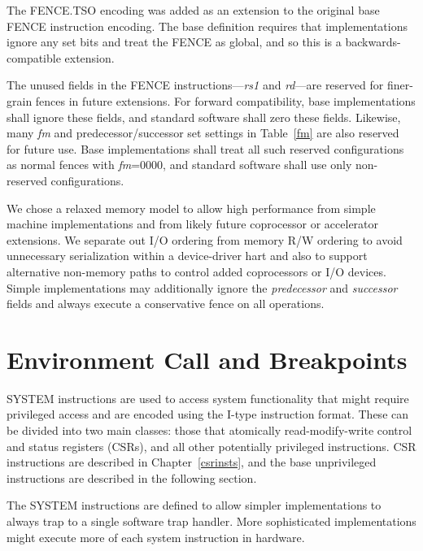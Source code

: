\begin{commentary}
  The FENCE.TSO encoding was added as an extension to the
  original base FENCE instruction encoding.  The base definition
  requires that implementations ignore any set bits and treat the
  FENCE as global, and so this is a backwards-compatible extension.
\end{commentary}

The unused fields in the FENCE instructions---{\em rs1} and {\em rd}---are
reserved for finer-grain fences in future extensions.  For forward
compatibility, base implementations shall ignore these fields, and standard
software shall zero these fields.  Likewise, many {\em fm} and
predecessor/successor set settings in Table~\ref{fm} are also reserved
for future use.  Base implementations shall treat all such reserved
configurations as normal fences with {\em fm}=0000, and standard
software shall use only non-reserved configurations.

\begin{commentary}
We chose a relaxed memory model to allow high performance from simple
machine implementations and from likely future
coprocessor or accelerator extensions.  We separate out I/O ordering
from memory R/W ordering to avoid unnecessary serialization within a
device-driver hart and also to support alternative non-memory paths
to control added coprocessors or I/O devices.  Simple implementations
may additionally ignore the {\em predecessor} and {\em successor}
fields and always execute a conservative fence on all operations.
\end{commentary}

\section{Environment Call and Breakpoints}

SYSTEM instructions are used to access system functionality that might
require privileged access and are encoded using the I-type instruction
format.  These can be divided into two main classes: those that
atomically read-modify-write control and status registers (CSRs), and
all other potentially privileged instructions. CSR instructions are
described in Chapter~\ref{csrinsts}, and the base unprivileged instructions
are described in the following section.

\begin{commentary}
The SYSTEM instructions are defined to allow simpler implementations
to always trap to a single software trap handler.  More sophisticated
implementations might execute more of each system instruction in
hardware.
\end{commentary}

